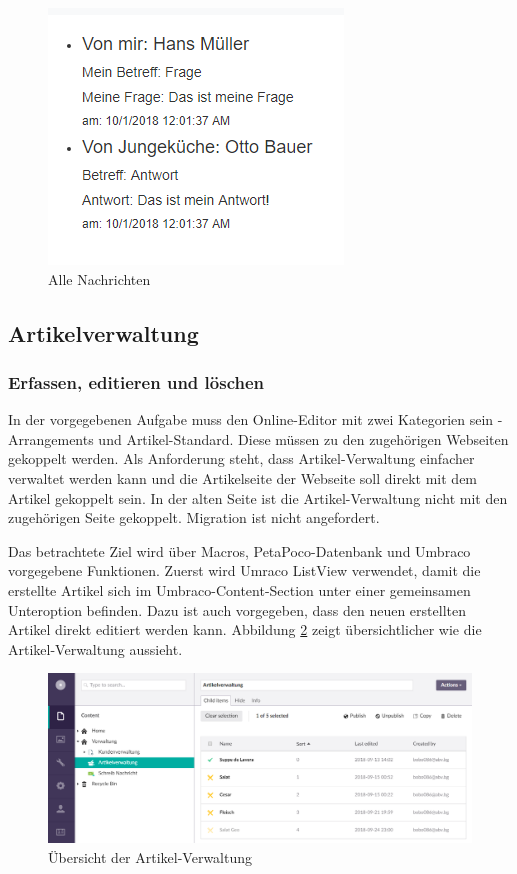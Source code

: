 \begin{figure}[h]
	\centering
	\includegraphics[width=0.3\linewidth]{Graphics/dialog.png}
	\caption[Nachricht]{Alle Nachrichten}
	\label{fig:alleNachrichten}
\end{figure}
 
 \pagebreak
 
\subsection{Artikelverwaltung}

\subsubsection{Erfassen, editieren und löschen}

In der vorgegebenen Aufgabe muss den Online-Editor mit zwei Kategorien sein - Arrangements und Artikel-Standard. Diese müssen zu den zugehörigen Webseiten gekoppelt werden. Als Anforderung steht, dass Artikel-Verwaltung einfacher verwaltet werden kann und die Artikelseite der Webseite soll direkt mit dem Artikel gekoppelt sein. In der alten Seite ist die Artikel-Verwaltung nicht mit den zugehörigen Seite gekoppelt. Migration ist nicht angefordert.

Das betrachtete Ziel wird über Macros, PetaPoco-Datenbank \cite{Robinson2018} und Umbraco vorgegebene Funktionen. Zuerst wird Umraco ListView verwendet, damit die erstellte Artikel sich im Umbraco-Content-Section unter einer gemeinsamen Unteroption befinden. Dazu ist auch vorgegeben, dass den neuen erstellten Artikel direkt editiert werden kann. Abbildung \ref{fig:ArtikelVerwaltung} zeigt übersichtlicher wie die Artikel-Verwaltung aussieht.

\begin{figure}[h]
	\centering
	\includegraphics[width=1\linewidth]{Graphics/ArtikelVerwaltung.png}
	\caption[ArtikelVerwaltung]{Übersicht der Artikel-Verwaltung}
	\label{fig:ArtikelVerwaltung}
\end{figure}

